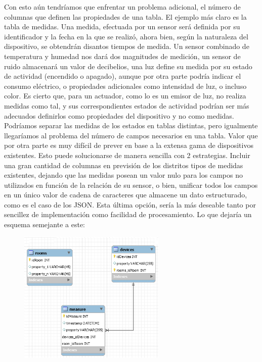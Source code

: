 Con esto aún tendríamos que enfrentar un problema adicional, el número de columnas que definen las propiedades de una tabla. El ejemplo más claro es la tabla de medidas. Una medida, efectuada por un sensor será definida por su identificador y la fecha en la que se realizó, ahora bien, según la naturaleza del dispositivo, se obtendrán disantos tiempos de medida. Un sensor combinado de temperatura y humedad nos dará dos magnitudes de medición, un sensor de ruido almacenará un valor de decibelios, una luz define su medida por su estado de actividad (encendido o apagado), aunque por otra parte podría indicar el consumo eléctrico, o propiedades adicionales como intensidad de luz, o incluso color. Es cierto que, para un actuador, como lo es un emisor de luz, no realiza medidas como tal, y sus correspondientes estados de actividad podrían ser más adecuados definirlos como propiedades del dispositivo y no como medidas. Podríamos separar las medidas de los estados en tablas distintas, pero igualmente llegaríamos al problema del número de campos necesarios en una tabla. Valor que por otra parte es muy difícil de prever en base a la extensa gama de dispositivos existentes. Esto puede solucionarse de manera sencilla con 2 estrategias. Incluir una gran cantidad de columnas en previsión de los distritos tipos de medidas existentes, dejando que las medidas posean un valor nulo para los campos no utilizados en función de la relación de su sensor, o bien, unificar todos los campos en un único valor de cadena de caracteres que almacene un dato estructurado, como es el caso de los JSON. Esta última opción, sería la más deseable tanto por sencillez de implementación como facilidad de procesamiento. Lo que dejaría un esquema semejante a este:

\begin{figure}[hbt!]
\centering
\includegraphics[height=2.5in]{figures/SQLSchemaExample_3.png}
\end{figure}

